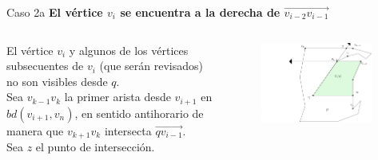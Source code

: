 \documentclass[aspectratio=169,xcolor=dvipsnames, t]{beamer}
\begin{document}
\begin{frame}{Caso 2a}
  \textbf{El vértice $v_{i}$ se encuentra a la derecha de $\overrightarrow{v_{i-2}v_{i-1}}$}\\
  \vspace{0.5cm}
  \begin{columns}
    \begin{column}{0.45\textwidth}
      El vértice $v_{i}$ y algunos de los vértices subsecuentes de $v_{i}$ (que serán revisados) no son visibles desde $q$.\\
      \vspace{0.5cm}
      Sea $v_{k-1}v_{k}$ la primer arista desde $v_{i+1}$ en $bd(v_{i+1},v_{n})$, en sentido antihorario de manera que $v_{k+1}v_{k}$ intersecta $\overrightarrow{qv_{i-1}}$.\\
      \vspace{0.5cm}
      Sea $z$ el punto de intersección.
    \end{column}
    \begin{column}{0.45\textwidth}  %
      \vspace{-1.5cm} %
      \begin{figure}
        \centering
        \includegraphics[width=0.95\textwidth]{imagenes/Caso2.4b.png}
      \end{figure}
    \end{column}
  \end{columns}
\end{frame}

\end{document}
